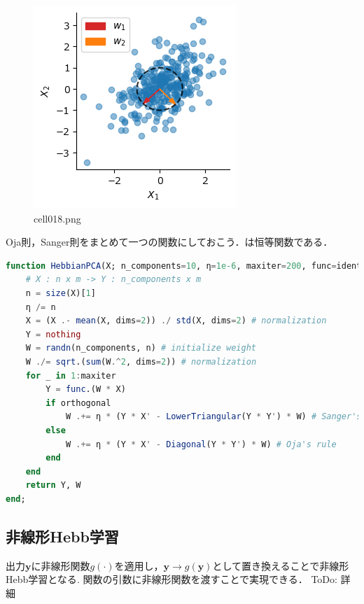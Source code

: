 \begin{figure}[ht]
	\centering
	\includegraphics[scale=0.8, max width=\linewidth]{./fig/local-learning-rule/pca-hebbian-learning/cell018.png}
	\caption{cell018.png}
	\label{cell018.png}
\end{figure}
Oja則，Sanger則をまとめて一つの関数にしておこう．は恒等関数である．
\begin{lstlisting}[language=julia]
function HebbianPCA(X; n_components=10, η=1e-6, maxiter=200, func=identity, orthogonal=true)
    # X : n x m -> Y : n_components x m
    n = size(X)[1]
    η /= n
    X = (X .- mean(X, dims=2)) ./ std(X, dims=2) # normalization
    Y = nothing
    W = randn(n_components, n) # initialize weight
    W ./= sqrt.(sum(W.^2, dims=2)) # normalization
    for _ in 1:maxiter
        Y = func.(W * X)
        if orthogonal
            W .+= η * (Y * X' - LowerTriangular(Y * Y') * W) # Sanger's rule
        else
            W .+= η * (Y * X' - Diagonal(Y * Y') * W) # Oja's rule
        end
    end
    return Y, W
end;
\end{lstlisting}
\subsection{非線形Hebb学習}
出力$\mathbf{y}$に非線形関数$g(\cdot)$を適用し，$\mathbf{y}\to g(\mathbf{y})$として置き換えることで非線形Hebb学習となる\citep{Oja1997-hr}\citep{Brito2016-mx}. 関数の引数に非線形関数を渡すことで実現できる．
ToDo: 詳細
